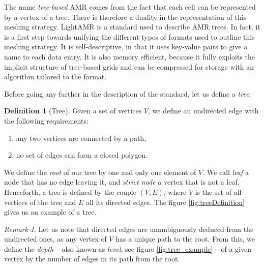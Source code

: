 \documentclass[
	a4paper,
	12pt,
	raggedright,
	twoside
]{tufte-style-article}
\theoremstyle{definition}
\newtheorem{definition}{Definition}[section]
\theoremstyle{remark}
\newtheorem*{remark}{Remark}
\begin{document}
\newline
The name \textit{tree-based} \Gls{AMR} comes from the fact that each cell can be represented by a vertex of a tree. There is therefore a duality in the representation of this meshing strategy. LightAMR is a standard used to describe \Gls{AMR} trees. In fact, it is a first step towards unifying the different types of formats used to outline this meshing strategy. It is self-descriptive, in that it uses key-value pairs to give a name to each data entry. It is also memory efficient, because it fully exploits the implicit structure of tree-based grids and can be compressed for storage with an algorithm tailored to the format.\cite{compression}


Before going any further in the description of the standard, let us define a \textit{tree}:

\begin{definition}[Tree] \label{def:tree}
Given a set of vertices $V$, we define an undirected edge with the following requirements:
\begin{enumerate}
    \item[(1)] any two vertices are connected by a path,
    \item[(2)] no set of edges can form a closed polygon.
\end{enumerate}
We define the \textit{root} of our tree by one and only one element of $V$. We call \textit{leaf} a node that has no edge leaving it, and \textit{strict node} a vertex that is not a leaf. Henceforth, a tree is defined by the couple $(V, E)$, where $V$ is the set of all vertices of the tree and $E$ all its directed edges. The figure \ref{fig:treeDefinition} gives us an example of a tree.
\end{definition}
\begin{remark}
Let us note that directed edges are unambiguously deduced from the undirected ones, as any vertex of $V$ has a unique path to the root. From this, we define the \textit{depth} -- also known as \textit{level}, see figure  \ref{fig:tree_example} -- of a given vertex by the number of edges in its path from the root.
\end{remark}
\begin{figure}
    \centering
    
\end{figure}
\end{document}
